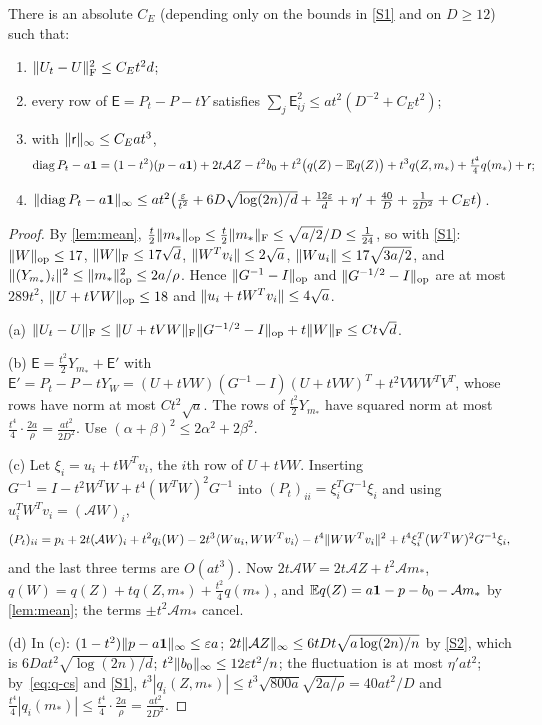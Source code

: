 \begin{lemma}\label{lem:retraction}
There is an absolute $C_E$ (depending only on the bounds in \ref{S1} and on
$D\ge12$) such that:
\begin{enumerate}[label=(\alph*)]
\item $\lVert U_t-U\rVert_{\mathrm F}^2\le C_Et^2d$;
\item every row of $\mathsf E=P_t-P-tY$ satisfies
$\sum_j\mathsf E_{ij}^2\le at^2(D^{-2}+C_Et^2)$;
\item with $\lVert \mathsf r\rVert_\infty\le C_Eat^3$,
\[
 \operatorname{diag} P_t-a\mathbf 1=(1-t^2)(p-a\mathbf 1)+2t\mathcal AZ-t^2b_0+t^2\bigl(q(Z)-\mathbb E q(Z)\bigr)
 +t^3q(Z,m_*)+\tfrac{t^4}4q(m_*)+\mathsf r ;
\]
\item $\lVert \operatorname{diag} P_t-a\mathbf 1\rVert_\infty\le at^2\bigl(\frac{\varepsilon}{t^2}
+6D\sqrt{\log(2n)/d}+\frac{12\varepsilon}d+\eta'+\frac{40}D+\frac1{2D^2}+C_Et\bigr)$.
\end{enumerate}
\end{lemma}

\begin{proof}
By \cref{lem:mean}, $\frac t2\lVert m_*\rVert_{\mathrm{op}}\le\frac t2\lVert m_*\rVert_{\mathrm F}\le\sqrt{a/2}/D\le\frac1{24}$,
so with \ref{S1}: $\lVert W\rVert_{\mathrm{op}}\le17$, $\lVert W\rVert_{\mathrm F}\le17\sqrt d$,
$\lVert W^Tv_i\rVert\le2\sqrt a$, $\lVert Wu_i\rVert\le17\sqrt{3a/2}$, and
$\lVert (Y_{m_*})_i\rVert^2\le\lVert m_*\rVert_{\mathrm{op}}^2\le2a/\rho$. Hence $\lVert G^{-1}-I\rVert_{\mathrm{op}}$ and
$\lVert G^{-1/2}-I\rVert_{\mathrm{op}}$ are at most $289t^2$, $\lVert U+tVW\rVert_{\mathrm{op}}\le18$ and
$\lVert u_i+tW^Tv_i\rVert\le4\sqrt a$.

(a) $\lVert U_t-U\rVert_{\mathrm F}\le\lVert U+tVW\rVert_{\mathrm F}\lVert G^{-1/2}-I\rVert_{\mathrm{op}}+t\lVert W\rVert_{\mathrm F}\le Ct\sqrt d$.

(b) $\mathsf E=\frac{t^2}2Y_{m_*}+\mathsf E'$ with
$\mathsf E'=P_t-P-tY_W=(U+tVW)(G^{-1}-I)(U+tVW)^T+t^2VWW^TV^T$, whose rows have
norm at most $Ct^2\sqrt a$. The rows of $\frac{t^2}2Y_{m_*}$ have squared norm at
most $\frac{t^4}4\cdot\frac{2a}\rho=\frac{at^2}{2D^2}$. Use $(\alpha+\beta)^2\le
2\alpha^2+2\beta^2$.

(c) Let $\xi_i=u_i+tW^Tv_i$, the $i$th row of $U+tVW$. Inserting
$G^{-1}=I-t^2W^TW+t^4(W^TW)^2G^{-1}$ into $(P_t)_{ii}=\xi_i^TG^{-1}\xi_i$ and using
$u_i^TW^Tv_i=(\mathcal AW)_i$,
\[
 (P_t)_{ii}=p_i+2t(\mathcal AW)_i+t^2q_i(W)-2t^3\langle Wu_i,WW^Tv_i\rangle
 -t^4\lVert WW^Tv_i\rVert^2+t^4\xi_i^T(W^TW)^2G^{-1}\xi_i ,
\]
and the last three terms are $O(at^3)$. Now $2t\mathcal AW=2t\mathcal AZ+t^2\mathcal
Am_*$, $q(W)=q(Z)+tq(Z,m_*)+\frac{t^2}4q(m_*)$, and
$\mathbb E q(Z)=a\mathbf 1-p-b_0-\mathcal Am_*$ by \cref{lem:mean}; the terms $\pm t^2\mathcal
Am_*$ cancel.

(d) In (c): $(1-t^2)\lVert p-a\mathbf 1\rVert_\infty\le\varepsilon a$;
$2t\lVert \mathcal AZ\rVert_\infty\le6tD t\sqrt{a\log(2n)/n}$ by \ref{S2}, which is
$6Dat^2\sqrt{\log(2n)/d}$; $t^2\lVert b_0\rVert_\infty\le12\varepsilon t^2/n$; the fluctuation is
at most $\eta'at^2$; by~\eqref{eq:q-cs} and \ref{S1},
$t^3|q_i(Z,m_*)|\le t^3\sqrt{800a}\sqrt{2a/\rho}=40at^2/D$ and
$\frac{t^4}4|q_i(m_*)|\le\frac{t^4}4\cdot\frac{2a}\rho=\frac{at^2}{2D^2}$.
\end{proof}

